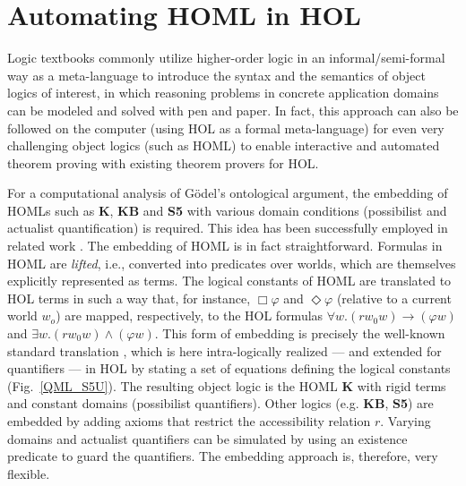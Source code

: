 \documentclass{llncs}
\newcommand{\imp}{{\rightarrow}}
\begin{document}








\section{Automating HOML in HOL}\label{sec:homlinhol}

Logic textbooks %
commonly utilize higher-order logic in an informal/semi-formal way as
a meta-language to introduce the syntax and the semantics of object
logics of interest, in which reasoning problems in concrete
application domains can be modeled and solved with pen and paper. In
fact, this approach can also be followed on the computer (using HOL as
a formal meta-language) for even very challenging object logics (such
as HOML) to enable interactive and automated theorem proving with
existing theorem provers for HOL.


For a computational analysis of G\"odel's ontological argument, the embedding of HOMLs such as \textbf{K},
\textbf{KB} and \textbf{S5} with various domain conditions (possibilist and actualist quantification)
is required. This idea has been successfully employed in related work
\cite{C40}. The embedding of HOML is in fact
straightforward. Formulas in HOML are \emph{lifted}, i.e., converted into predicates
over worlds, which are themselves explicitly represented as
terms. The logical constants of HOML are translated to HOL terms in such a way that, for instance, 
$\Box \varphi$ and $\Diamond \varphi$ (relative to a current world
$w_o$) are mapped, respectively, to the HOL formulas
$\forall w. (r w_0 w) \imp (\varphi w)$ and
$\exists w. (r w_0 w) \wedge (\varphi w)$. This form of embedding is
precisely the well-known standard translation
\cite{DBLP:journals/logcom/Ohlbach91}, which is here intra-logically
realized --- and extended for quantifiers --- in HOL by stating a set
of equations defining the logical constants (Fig.~\ref{QML_S5U}). The
resulting object logic is the HOML \textbf{K} with rigid terms and constant
domains (possibilist quantifiers). Other logics (e.g. \textbf{KB}, \textbf{S5}) are
embedded by adding axioms that restrict the accessibility relation
$r$. Varying domains and actualist quantifiers can be simulated by using
 an existence predicate to guard the
quantifiers. The embedding approach is, therefore, very flexible.
\end{document}
